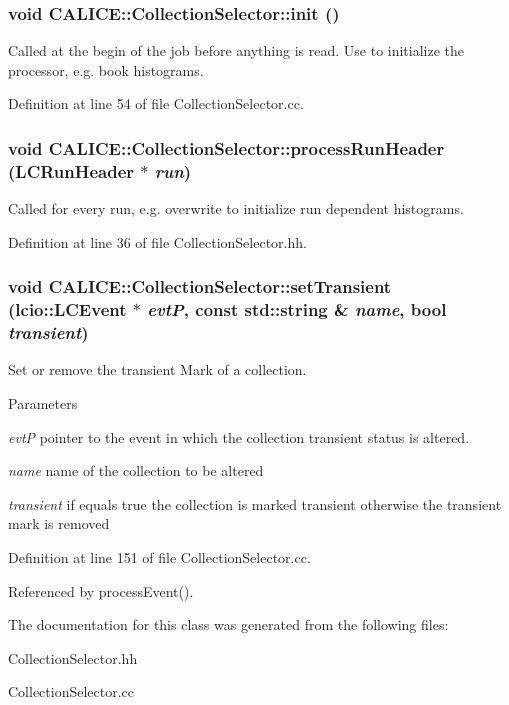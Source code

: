 \subsubsection[{init}]{\setlength{\rightskip}{0pt plus 5cm}void CALICE::CollectionSelector::init ()}\label{classCALICE_1_1CollectionSelector_acea2e18ce2a94f1b3a94bbaa1e4cc734}


Called at the begin of the job before anything is read. Use to initialize the processor, e.g. book histograms. 

Definition at line 54 of file CollectionSelector.cc.
\subsubsection[{processRunHeader}]{\setlength{\rightskip}{0pt plus 5cm}void CALICE::CollectionSelector::processRunHeader (LCRunHeader $\ast$ {\em run})\hspace{0.3cm}{\ttfamily  [inline]}}\label{classCALICE_1_1CollectionSelector_a81a6bfe4a27cbd181767f6e2614e80f5}


Called for every run, e.g. overwrite to initialize run dependent histograms. 

Definition at line 36 of file CollectionSelector.hh.
\subsubsection[{setTransient}]{\setlength{\rightskip}{0pt plus 5cm}void CALICE::CollectionSelector::setTransient (lcio::LCEvent $\ast$ {\em evtP}, \/  const std::string \& {\em name}, \/  bool {\em transient})\hspace{0.3cm}{\ttfamily  [static, protected]}}\label{classCALICE_1_1CollectionSelector_a712a0fa500f4d84da8804000d31f2a6e}


Set or remove the transient Mark of a collection. 
\begin{DoxyParams}{Parameters}
\item[{\em evtP}]pointer to the event in which the collection transient status is altered. \item[{\em name}]name of the collection to be altered \item[{\em transient}]if equals true the collection is marked transient otherwise the transient mark is removed \end{DoxyParams}


Definition at line 151 of file CollectionSelector.cc.

Referenced by processEvent().

The documentation for this class was generated from the following files:\begin{DoxyCompactItemize}
\item 
CollectionSelector.hh\item 
CollectionSelector.cc\end{DoxyCompactItemize}
